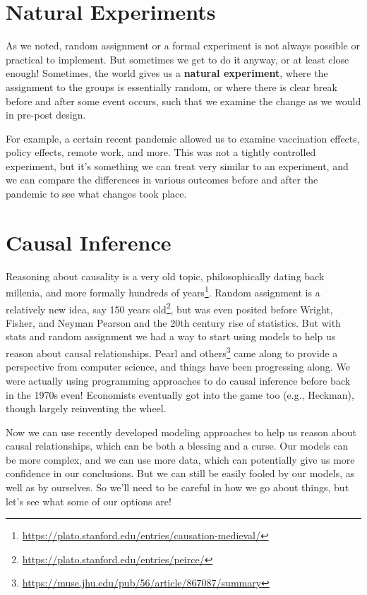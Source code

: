 \documentclass[
  letterpaper,
]{krantz}
\DeclareRobustCommand{\href}[2]{#2\footnote{\url{#1}}}
\begin{document}
\section{Natural Experiments}\label{natural-experiments}

As we noted, random assignment or a formal experiment is not always
possible or practical to implement. But sometimes we get to do it
anyway, or at least close enough! Sometimes, the world gives us a
\textbf{natural experiment}, where the assignment to the groups is
essentially random, or where there is clear break before and after some
event occurs, such that we examine the change as we would in pre-post
design.

For example, a certain recent pandemic allowed us to examine vaccination
effects, policy effects, remote work, and more. This was not a tightly
controlled experiment, but it's something we can treat very similar to
an experiment, and we can compare the differences in various outcomes
before and after the pandemic to see what changes took place.

\section{Causal Inference}\label{causal-inference}

Reasoning about causality is a very old topic, philosophically dating
back millenia, and more formally
\href{https://plato.stanford.edu/entries/causation-medieval/}{hundreds
of years}. Random assignment is a relatively new idea, say
\href{https://plato.stanford.edu/entries/peirce/}{150 years old}, but
was even posited before Wright, Fisher, and Neyman Pearson and the 20th
century rise of statistics. But with stats and random assignment we had
a way to start using models to help us reason about causal
relationships.
\href{https://muse.jhu.edu/pub/56/article/867087/summary}{Pearl and
others} came along to provide a perspective from computer science, and
things have been progressing along. We were actually using programming
approaches to do causal inference before back in the 1970s even!
Economists eventually got into the game too (e.g., Heckman), though
largely reinventing the wheel.

Now we can use recently developed modeling approaches to help us reason
about causal relationships, which can be both a blessing and a curse.
Our models can be more complex, and we can use more data, which can
potentially give us more confidence in our conclusions. But we can still
be easily fooled by our models, as well as by ourselves. So we'll need
to be careful in how we go about things, but let's see what some of our
options are!
\end{document}
